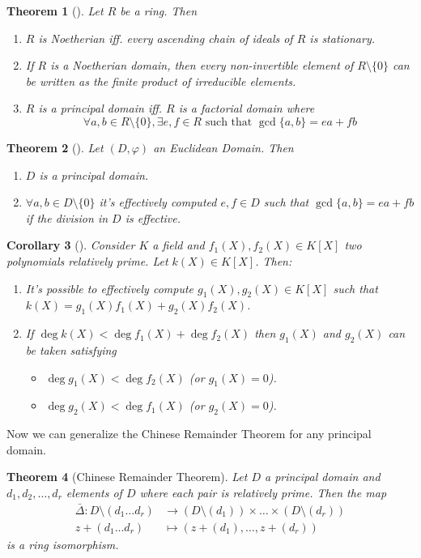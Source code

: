 \documentclass[12pt,a4paper]{article}
\newtheorem{theorem}{Theorem}[section]
\newtheorem{corollary}[theorem]{Corollary}
\theoremstyle{definition}
\begin{document}
\begin{theorem}[]
Let $R$ be a ring. Then
\begin{enumerate}
\item $R$ is Noetherian iff. every ascending chain of ideals of $R$ is stationary.
\item If $R$ is a Noetherian domain, then every non-invertible element of $R \setminus \{0 \}$ can be written as the finite product of irreducible elements.
\item $R$ is a principal domain iff. $R$ is a factorial domain where 
\[
\forall a, b \in R \setminus \{ 0 \}, \exists e,f \in R \text{ such that } \gcd \{ a,b\} = ea+fb
\]
\end{enumerate}
\end{theorem} 

\begin{theorem}[]
Let $(D, \varphi)$ an Euclidean Domain. Then
\begin{enumerate}
\item $D$ is a principal domain.
\item $\forall a,b \in D \setminus \{ 0 \}$ it's effectively computed $e, f \in D$ such that $\gcd \{ a,b \}  = ea+fb$ if the division in $D$ is effective.
\end{enumerate}
\end{theorem}

\begin{corollary}[]
Consider $K$ a field and $f_1(X), f_2(X) \in K[X]$ two polynomials relatively prime. Let $k(X)\in K[X]$. Then:
\begin{enumerate}
\item It's possible to effectively compute $g_1(X), g_2(X) \in K[X]$ such that $k(X) = g_1(X)f_1(X)+g_2(X)f_2(X)$.
\item If $\deg k(X) < \deg f_1(X) + \deg f_2(X)$ then $g_1(X)$ and $g_2(X)$ can be taken satisfying
\begin{itemize}
\item $\deg g_1(X) < \deg f_2(X)$ (or $g_1(X) = 0$).
\item $\deg g_2(X) < \deg f_1(X)$ (or $g_2(X) = 0$).
\end{itemize}
\end{enumerate}
\end{corollary}

Now we can generalize the Chinese Remainder Theorem for any principal domain.

\begin{theorem}[Chinese Remainder Theorem]
Let $D$ a principal domain and $d_1, d_2, \ldots, d_r$ elements of $D$ where each pair is relatively prime. Then the map
\begin{equation*}
\begin{aligned}
\bar{\Delta}: D \setminus (d_1 \ldots d_r) & \to (D \setminus (d_1)) \times \ldots \times (D \setminus (d_r)) \\
z + (d_1 \ldots d_r) & \mapsto (z + (d_1), \ldots, z + (d_r))
\end{aligned}
\end{equation*}
is a ring isomorphism.
\end{theorem}
\end{document}
